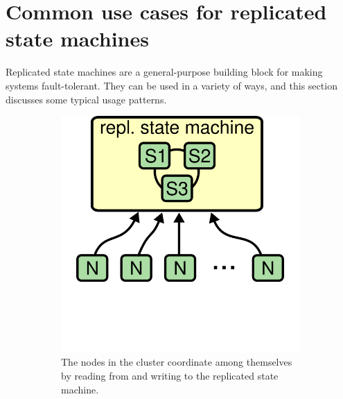 \section{Common use cases for replicated state machines}
\label{motivation:uses}

Replicated state machines are a general-purpose building block for making
systems fault-tolerant. They can be used in a variety of ways, and this
section discusses some typical usage patterns.

\begin{figure}
\hfill
\begin{subfigure}{.45\textwidth}
\centering
\includegraphics[scale=.5]{motivation/activeactive}
\caption{
The nodes in the cluster coordinate among themselves by reading from and
writing to the replicated state machine.
\\
}
\label{fig:motivation:activeactive}
\end{subfigure}
\hfill
\begin{subfigure}{.45\textwidth}
\centering

\end{subfigure}
\end{figure}
